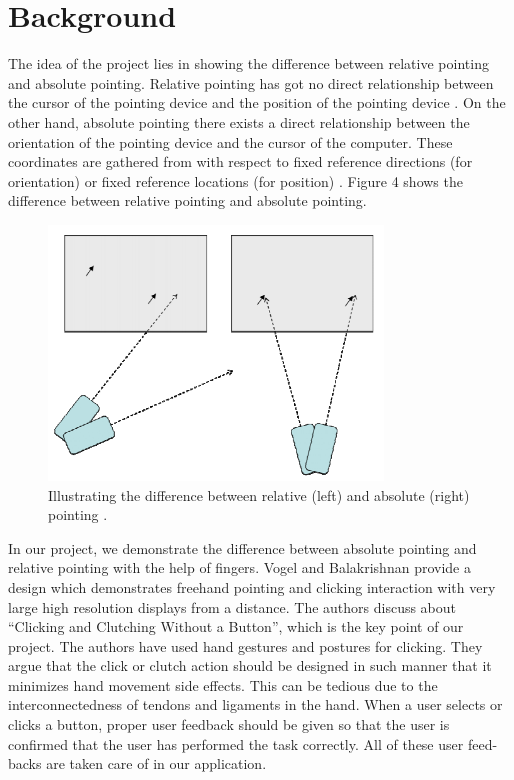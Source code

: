 \documentclass[titlepage]{article}
\begin{document}
\section{Background}
The idea of the project lies in showing the difference between relative pointing and absolute pointing. Relative pointing has got no direct relationship between the cursor of the pointing device and the position of the pointing device \cite{2}. On the other hand, absolute pointing there exists a direct relationship between the orientation of the pointing device and the cursor of the computer. These coordinates are gathered from with respect to fixed reference directions (for orientation) or fixed reference locations (for position) \cite{2}. Figure 4 shows the difference between relative pointing and absolute pointing. 

\begin{figure}[!h]
\centering
\includegraphics[width=3.5in]{Figure_4}
\caption{Illustrating the difference between relative (left) and absolute (right) pointing \cite{2}.}
\end{figure}

In our project, we demonstrate the difference between absolute pointing and relative pointing with the help of fingers. Vogel and Balakrishnan \cite{3} provide a design which demonstrates freehand pointing and clicking interaction with very large high resolution displays from a distance. The authors discuss about “Clicking and Clutching Without a Button”, which is the key point of our project. The authors have used hand gestures and postures for clicking. They argue that the click or clutch action should be designed in such manner that it minimizes hand movement side effects. This can be tedious due to the interconnectedness of tendons and ligaments in the hand. When a user selects or clicks a button, proper user feedback should be given so that the user is confirmed that the user has performed the task correctly. All of these user feed-backs are taken care of in our application.
\end{document}
